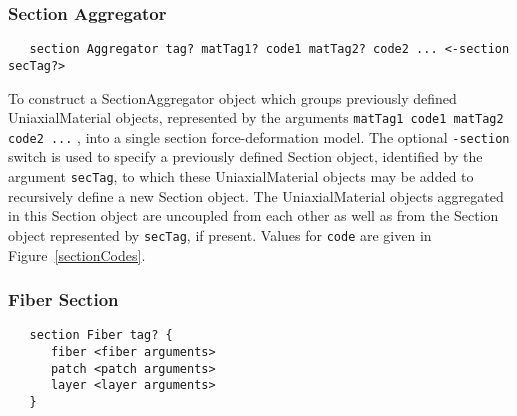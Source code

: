 \documentclass[12pt]{article}
\begin{document}


\subsubsection{Section Aggregator}
{\sf\small
\begin{verbatim}
   section Aggregator tag? matTag1? code1 matTag2? code2 ... <-section secTag?>
\end{verbatim}
}

To construct a SectionAggregator object which groups
previously defined UniaxialMaterial objects, represented by the
arguments {\tt matTag1 code1 matTag2 code2 ...} , into a single section
force-deformation model. The optional {\tt -section} switch is used to
specify a previously defined Section object, identified by the
argument {\tt secTag}, to which these UniaxialMaterial objects may be
added to recursively define a new Section object. The UniaxialMaterial
objects aggregated in this Section object are uncoupled from each
other as well as from the Section object represented by {\tt secTag}, if
present. Values for {\tt code} are given in Figure~\ref{sectionCodes}.

\subsubsection{Fiber Section}
{\sf\small
\begin{verbatim}
   section Fiber tag? {
      fiber <fiber arguments>
      patch <patch arguments>
      layer <layer arguments>
   }
\end{verbatim}
}
\end{document}
